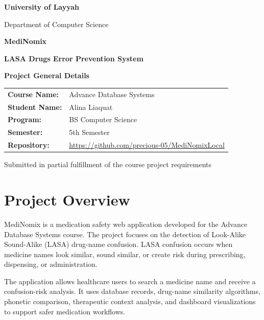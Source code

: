 \documentclass[12pt,a4paper]{article}
\begin{document}
\begin{titlepage}
    \centering
    \vspace*{1.2cm}

    {\Large \textbf{University of Layyah}\par}
    \vspace{0.5cm}
    {\large Department of Computer Science\par}

    \vspace{2.0cm}
    {\Huge \textbf{\textcolor{HeadingBlue}{MediNomix}}\par}
    \vspace{0.35cm}
    {\Large \textbf{LASA Drugs Error Prevention System}\par}

    \vspace{1.5cm}
    {\large \textbf{Project General Details}\par}

    \vfill

    \begin{tabular}{>{\bfseries}p{4.3cm}p{8.2cm}}
        Course Name: & Advance Database Systems \\
        Student Name: & Alina Liaquat \\
        Program: & BS Computer Science \\
        Semester: & 5th Semester \\
        Repository: & \url{https://github.com/precious-05/MediNomixLocal} \\
    \end{tabular}

    \vfill
    {\large Submitted in partial fulfillment of the course project requirements\par}
\end{titlepage}

\tableofcontents
\newpage

\section{Project Overview}

MediNomix is a medication safety web application developed for the Advance Database Systems course. The project focuses on the detection of Look-Alike Sound-Alike (LASA) drug-name confusion. LASA confusion occurs when medicine names look similar, sound similar, or create risk during prescribing, dispensing, or administration.

The application allows healthcare users to search a medicine name and receive a confusion-risk analysis. It uses database records, drug-name similarity algorithms, phonetic comparison, therapeutic context analysis, and dashboard visualizations to support safer medication workflows.
\end{document}

